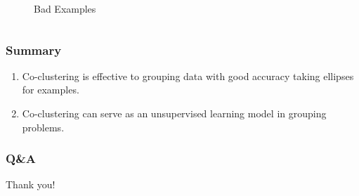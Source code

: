 \documentclass[aspectratio=169]{beamer}
\begin{document}
\begin{frame}
\begin{columns}
\begin{column}{.5\linewidth}
\begin{figure}[htbp]
{                    }
                    \caption{Bad Examples}
                \end{figure}
            \end{column}
        \end{columns}
        

    \end{frame}



    \begin{frame}
        \frametitle{Summary}
    
        \begin{enumerate}
            \item Co-clustering is effective to grouping data with good accuracy taking ellipses for examples. 
            \item Co-clustering can serve as an unsupervised learning model in grouping problems.
            
        \end{enumerate}
    
    \end{frame}
    \begin{frame}
        \frametitle{Q\&A}
    
        Thank you!
    
    \end{frame}
\end{document}
